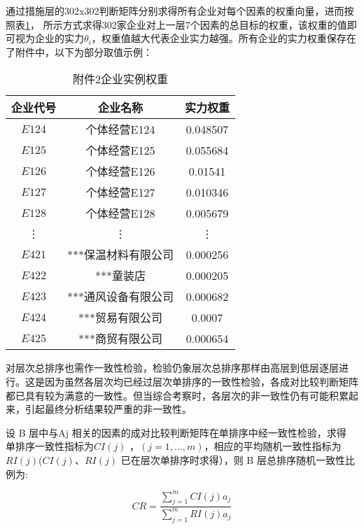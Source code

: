 \documentclass{cumcmthesis}
\begin{document}
通过措施层的302x302判断矩阵分别求得所有企业对每个因素的权重向量，进而按照表\ref{tablecenci}，
所示方式求得302家企业对上一层7个因素的总目标的权重，该权重的值即可视为企业的实力$\theta_i$，权重值越大代表企业实力越强。所有企业的实力权重保存在了附件中，以下为部分取值示例：

\begin{table}[H]
    \begin{center}
    \begin{tabular}{|c|c|c|}
        \hline
    企业代号 & 企业名称 & 实力权重\\
    \hline
    $E124$ & 个体经营E124 & 0.048507\\
    $E125$ & 个体经营E125 & 0.055684\\
    $E126$ & 个体经营E126 & 0.01541\\
    $E127$ & 个体经营E127 & 0.010346\\
    $E128$ & 个体经营E128 & 0.005679\\
    \vdots & \vdots & \vdots\\
    $E421$ & ***保温材料有限公司 & 0.000256\\
    $E422$ & ***童装店          & 0.000205\\
    $E423$ & ***通风设备有限公司 & 0.000682\\
    $E424$ & ***贸易有限公司 & 0.0007\\
    $E425$ & ***商贸有限公司 & 0.000654\\
    \hline
    \end{tabular}
    \end{center}
    \caption{附件2企业实例权重}
    \label{tablecenci}
    \end{table}

对层次总排序也需作一致性检验，检验仍象层次总排序那样由高层到低层逐层进行。这是因为虽然各层次均已经过层次单排序的一致性检验，各成对比较判断矩阵都已具有较为满意的一致性。但当综合考察时，各层次的非一致性仍有可能积累起来，引起最终分析结果较严重的非一致性。

设 B 层中与Aj 相关的因素的成对比较判断矩阵在单排序中经一致性检验，求得
单排序一致性指标为$CI\left(j\right)$ ，$\left(j = 1,...,m\right)$，相应的平均随机一致性指标为 $RI\left(j\right)$($CI\left(j\right)$、$RI\left(j\right)$ 已在层次单排序时求得），则 B 层总排序随机一致性比例为:


\begin{equation}
    CR = \frac{\sum^{m}_{j=1}CI\left(j\right)a_j}{\sum^{m}_{j=1}RI\left(j\right)a_j}
\end{equation}
\end{document}
